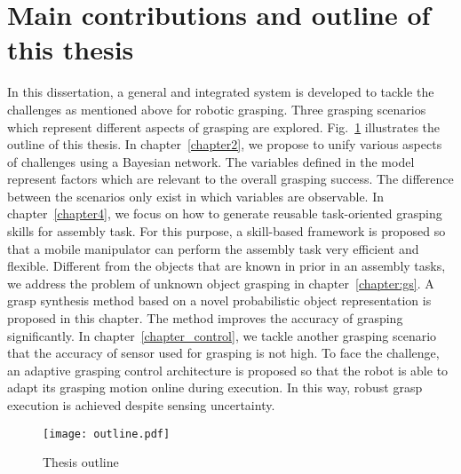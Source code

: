 \section{Main contributions and outline of this thesis}
In this dissertation, a general and integrated system is developed to tackle the challenges as mentioned above for robotic grasping. Three grasping scenarios which represent different aspects of grasping are explored. Fig.~\ref{fig:outline} illustrates the outline of this thesis. In chapter~\ref{chapter2}, we propose to unify various aspects of challenges using a Bayesian network. The variables defined in the model represent factors which are relevant to the overall grasping success. The difference between the scenarios only exist in which variables are observable. In chapter~\ref{chapter4}, we focus on how to generate reusable task-oriented grasping skills for assembly task. For this purpose, a skill-based framework is proposed so that a mobile manipulator can perform the assembly task very efficient and flexible. Different from the objects that are known in prior in an assembly tasks, we address the problem of unknown object grasping in chapter~\ref{chapter:gs}. A grasp synthesis method based on a novel probabilistic object representation is proposed in this chapter. The method improves the accuracy of grasping significantly. In chapter~\ref{chapter_control}, we tackle another grasping scenario that the accuracy of sensor used for grasping is not high. To face the challenge, an adaptive grasping control architecture is proposed so that the robot is able to adapt its grasping motion online during execution. In this way, robust grasp execution is achieved despite sensing uncertainty. 
\begin{figure}[!htbp]
\centering
\texttt{[image: outline.pdf]}
\captionsetup{justification=raggedright}
\caption{Thesis outline}
\label{fig:outline}
\end{figure} 
